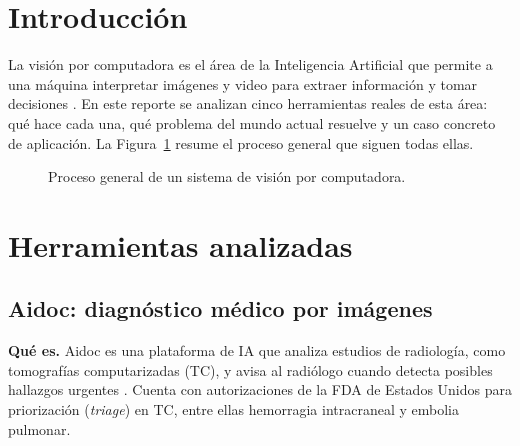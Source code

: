 \documentclass[11pt,letterpaper]{article}
\begin{document}
\portada


\section{Introducción}

La visión por computadora es el área de la Inteligencia Artificial que permite a una máquina interpretar imágenes y video para extraer información y tomar decisiones \parencite{iae_u1_diseno}. En este reporte se analizan cinco herramientas reales de esta área: qué hace cada una, qué problema del mundo actual resuelve y un caso concreto de aplicación. La Figura~\ref{fig:pipeline} resume el proceso general que siguen todas ellas.

\begin{figure}[ht]
\centering
{}
\caption{Proceso general de un sistema de visión por computadora.}
\label{fig:pipeline}
\end{figure}

\section{Herramientas analizadas}

\subsection{Aidoc: diagnóstico médico por imágenes}

\textbf{Qué es.} Aidoc es una plataforma de IA que analiza estudios de radiología, como tomografías computarizadas (TC), y avisa al radiólogo cuando detecta posibles hallazgos urgentes \parencite{aidoc_fda}. Cuenta con autorizaciones de la FDA de Estados Unidos para priorización (\textit{triage}) en TC, entre ellas hemorragia intracraneal y embolia pulmonar.
\end{document}

